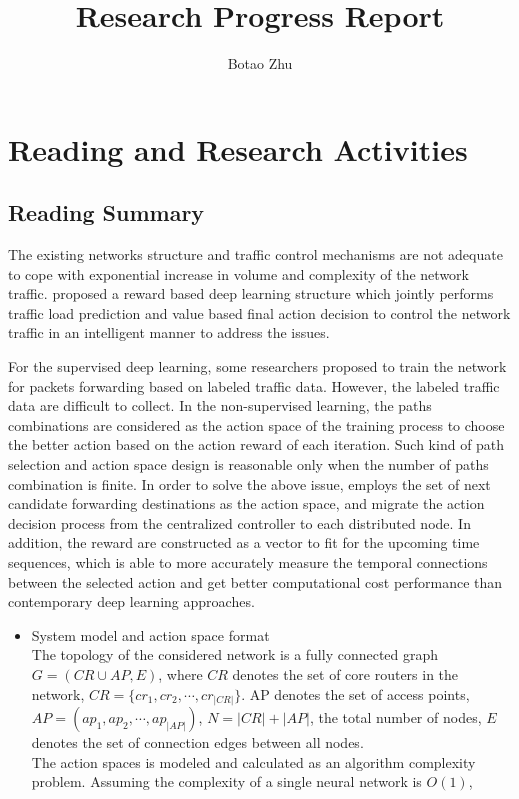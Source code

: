\documentclass[11pt]{report}
\title{Research Progress Report}
\author{Botao Zhu}
\begin{document}
	
	\maketitle
	 \chead{} 
	 \cfoot{} 
	\renewcommand{\footrulewidth}{1.0pt}
	\renewcommand{\headrulewidth}{2.0pt}
	\renewcommand{\arraystretch}{1.3}
	\pagestyle{fancy}
	
	\renewcommand{\thesection}{\arabic{section}}
	
	\section{Reading and Research Activities}
	
	\subsection{Reading Summary}
	
	The existing networks structure and traffic control mechanisms are not adequate to cope with exponential increase in volume and complexity of the network traffic. \cite{8489985} proposed a reward based deep learning structure which jointly performs traffic load prediction and value based final action decision to control the network traffic in an intelligent manner to address the issues.
	
	\noindent For the supervised deep learning, some researchers proposed to train the network for packets forwarding based on labeled traffic data. However, the labeled traffic data are difficult to collect. In the non-supervised learning, the paths combinations are considered as the action space of the training process to choose the better action based on the action reward of each iteration. Such kind of path selection and action space design is reasonable only when the number of paths combination is finite. In order to solve the above issue, \cite{8489985} employs the set of next candidate forwarding destinations as the action space, and migrate the action decision process from the centralized controller to each distributed node. In addition, the reward are constructed as a vector to fit for the upcoming time sequences, which is able to more accurately measure the temporal connections between the selected action and get better computational cost performance than contemporary deep learning approaches.
	\begin{itemize}
		\item System model and action space format\\
		The topology of the considered network is a fully connected graph $G=\left(CR\cup AP,E\right)$, where $CR$ denotes the set of core routers in the network, $CR=\{cr_1,cr_2, \cdots, cr_{|CR|}\}$. AP denotes the set of access points, $AP=\left(ap_1,ap_2,\cdots,ap_{|AP|}\right)$, $N=|CR|+|AP|$, the total number of nodes, $E$ denotes the set of connection edges between all nodes. \\
		The action spaces is modeled and calculated as an algorithm complexity problem. Assuming the complexity of a single neural network is $\mathit{O}\left(1\right)$, 
	\end{itemize}
	
\end{document}
